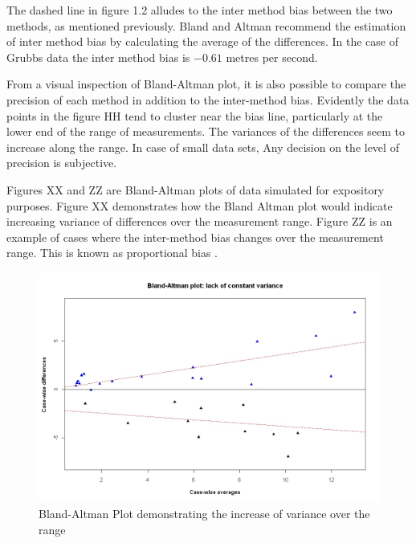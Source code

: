 \documentclass[Chap2main.tex]{subfiles}
\begin{document}
	The dashed line in figure 1.2 alludes to the inter method bias
	between the two methods, as mentioned previously. Bland and Altman
	recommend the estimation of inter method bias by calculating the
	average of the differences. In the case of Grubbs data the inter
	method bias is $-0.61$ metres per second.
	\newpage
	
	From a visual inspection of Bland-Altman plot, it is also possible
	to compare the precision of each method in addition to the
	inter-method bias.  Evidently the data points in the figure HH
	tend to cluster near the bias line, particularly at the lower end
	of the range of measurements. The variances of the differences
	seem to increase along the range. In case of small data sets, Any
	decision on the level of precision is subjective.
	
	Figures XX and ZZ are Bland-Altman plots of data simulated for
	expository purposes. Figure XX demonstrates how the Bland Altman
	plot would indicate increasing variance of differences over the
	measurement range. Figure ZZ is an example of cases where the
	inter-method bias changes over the measurement range. This is
	known as proportional bias \citep{ludbrook97}.
	
	\newpage
	\begin{figure}[h!]
		\begin{center}
			\includegraphics[width=125mm]{BAFanEffect.jpeg}
			\caption{Bland-Altman Plot demonstrating the increase of variance over the range}\label{BAFanEffect}
		\end{center}
	\end{figure}
	\newpage
	
\end{document}
